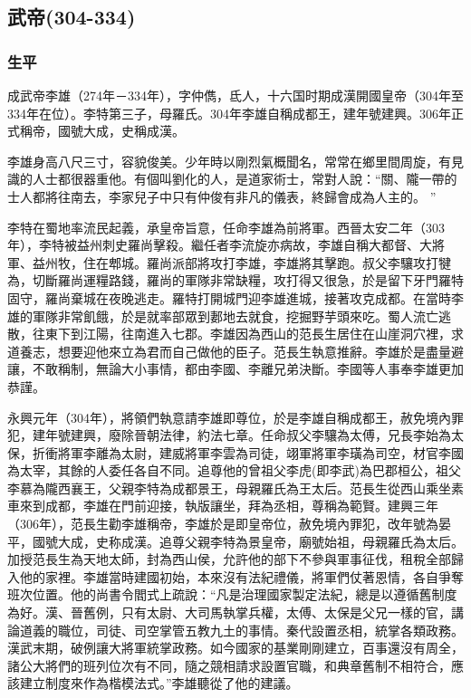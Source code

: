 
\subsection{武帝\tiny(304-334)}

\subsubsection{生平}

成武帝李雄（274年－334年），字仲儁，氐人，十六国时期成漢開國皇帝（304年至334年在位）。李特第三子，母羅氏。304年李雄自稱成都王，建年號建興。306年正式稱帝，國號大成，史稱成漢。

李雄身高八尺三寸，容貌俊美。少年時以剛烈氣概聞名，常常在鄉里間周旋，有見識的人士都很器重他。有個叫劉化的人，是道家術士，常對人說：“關、隴一帶的士人都將往南去，李家兒子中只有仲俊有非凡的儀表，終歸會成為人主的。 ”

李特在蜀地率流民起義，承皇帝旨意，任命李雄為前將軍。西晉太安二年（303年），李特被益州刺史羅尚擊殺。繼任者李流旋亦病故，李雄自稱大都督、大將軍、益州牧，住在郫城。羅尚派部將攻打李雄，李雄將其擊跑。叔父李驤攻打犍為，切斷羅尚運糧路錢，羅尚的軍隊非常缺糧，攻打得又很急，於是留下牙門羅特固守，羅尚棄城在夜晚逃走。羅特打開城門迎李雄進城，接著攻克成都。在當時李雄的軍隊非常飢餓，於是就率部眾到郪地去就食，挖掘野芋頭來吃。蜀人流亡逃散，往東下到江陽，往南進入七郡。李雄因為西山的范長生居住在山崖洞穴裡，求道養志，想要迎他來立為君而自己做他的臣子。范長生執意推辭。李雄於是盡量避讓，不敢稱制，無論大小事情，都由李國、李離兄弟決斷。李國等人事奉李雄更加恭謹。

永興元年（304年），將領們執意請李雄即尊位，於是李雄自稱成都王，赦免境內罪犯，建年號建興，廢除晉朝法律，約法七章。任命叔父李驤為太傅，兄長李始為太保，折衝將軍李離為太尉，建威將軍李雲為司徒，翊軍將軍李璜為司空，材官李國為太宰，其餘的人委任各自不同。追尊他的曾祖父李虎(即李武)為巴郡桓公，祖父李慕為隴西襄王，父親李特為成都景王，母親羅氏為王太后。范長生從西山乘坐素車來到成都，李雄在門前迎接，執版讓坐，拜為丞相，尊稱為範賢。建興三年（306年），范長生勸李雄稱帝，李雄於是即皇帝位，赦免境內罪犯，改年號為晏平，國號大成，史称成漢。追尊父親李特為景皇帝，廟號始祖，母親羅氏為太后。加授范長生為天地太師，封為西山侯，允許他的部下不參與軍事征伐，租稅全部歸入​​他的家裡。李雄當時建國初始，本來沒有法紀禮儀，將軍們仗著恩情，各自爭奪班次位置。他的尚書令閻式上疏說：“凡是治理國家製定法紀，總是以遵循舊制度為好。漢、晉舊例，只有太尉、大司馬執掌兵權，太傅、太保是父兄一樣的官，講論道義的職位，司徒、司空掌管五教九土的事情。秦代設置丞相，統掌各類政務。漢武末期，破例讓大將軍統掌政務。如今國家的基業剛剛建立，百事還沒有周全，諸公大將們的班列位次有不同，隨之競相請求設置官職，和典章舊制不相符合，應該建立制度來作為楷模法式。”李雄聽從了他的建議。

